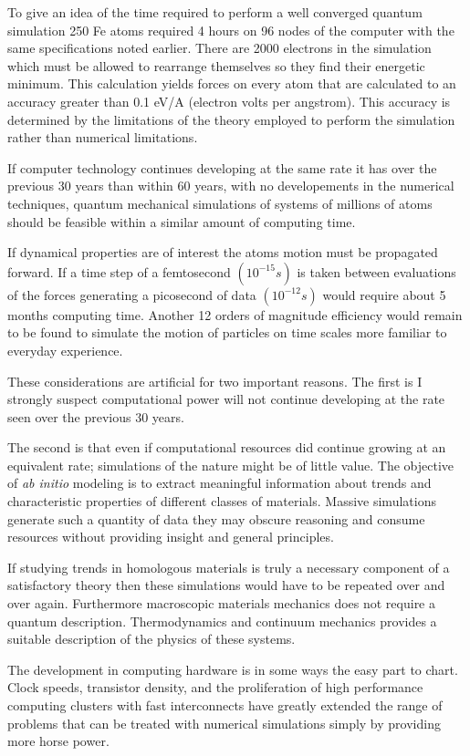 To give an idea of the time required to perform a well converged quantum simulation 
250 Fe atoms required 4 hours on 96 nodes of the computer with the same 
specifications noted earlier. There are 2000 electrons in the simulation which must be allowed
to rearrange themselves so they find their energetic minimum. This calculation yields forces on every 
atom that are calculated to an accuracy greater than 0.1 eV/A (electron volts per angstrom).
This accuracy is determined by the limitations of the theory employed to perform the simulation
rather than numerical limitations.

If computer technology continues developing at the same rate it has
over the previous 30 years than within 60 years, with no developements in the numerical techniques, 
quantum mechanical simulations of systems of millions of atoms should be feasible
within a similar amount of computing time. 

If dynamical properties are of interest the atoms motion must be propagated forward. 
If a time step of a femtosecond $(10^{-15}s)$ is taken between evaluations of the 
forces generating a picosecond of data $(10^{-12}s)$ would require about 5 months 
computing time. Another 12 orders of magnitude efficiency would remain to be found to 
simulate the motion of particles on time scales more familiar to everyday experience.

These considerations are artificial for two important reasons. The first
is I strongly suspect computational power will not continue developing at the rate
seen over the previous 30 years. 

The second is that even if computational resources did continue growing 
at an equivalent rate; simulations of the nature might be of little value.
The objective of {\it ab initio} modeling is to extract meaningful information
about trends and characteristic properties of different classes of materials. 
Massive simulations generate such a quantity of data they may obscure 
reasoning and consume resources without providing insight and general principles.

If studying trends in homologous materials is truly a necessary component of a satisfactory
theory then these simulations would have to be repeated over and over again.
Furthermore macroscopic materials mechanics does not require a quantum description.
Thermodynamics and continuum mechanics provides a suitable description of the physics of these systems. 

The development in computing hardware is in some ways the easy part to chart. 
Clock speeds, transistor density, and the proliferation of high 
performance computing clusters with fast interconnects have greatly extended 
the range of problems that can be treated with numerical simulations
simply by providing more horse power.

